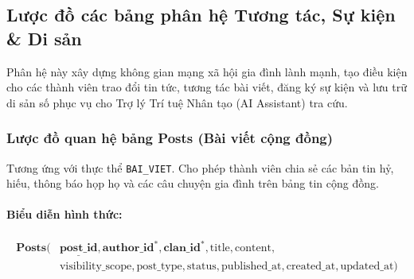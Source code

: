 \subsection{Lược đồ các bảng phân hệ Tương tác, Sự kiện \& Di sản}
\label{subsec:luoc_do_community_events_heritage}

Phân hệ này xây dựng không gian mạng xã hội gia đình lành mạnh, tạo điều kiện cho các thành viên trao đổi tin tức, tương tác bài viết, đăng ký sự kiện và lưu trữ di sản số phục vụ cho Trợ lý Trí tuệ Nhân tạo (AI Assistant) tra cứu.

\subsubsection{Lược đồ quan hệ bảng Posts (Bài viết cộng đồng)}
Tương ứng với thực thể \texttt{BAI\_VIET}. Cho phép thành viên chia sẻ các bản tin hỷ, hiếu, thông báo họp họ và các câu chuyện gia đình trên bảng tin cộng đồng.

\paragraph{Biểu diễn hình thức:}
\[
\begin{aligned}
\textbf{Posts}\big(
&\underline{\textbf{post\_id}}, \textbf{author\_id}^*, \textbf{clan\_id}^*, \text{title}, \text{content}, \\
&\text{visibility\_scope}, \text{post\_type}, \text{status}, \text{published\_at}, \text{created\_at}, \text{updated\_at}
\big)
\end{aligned}
\]

